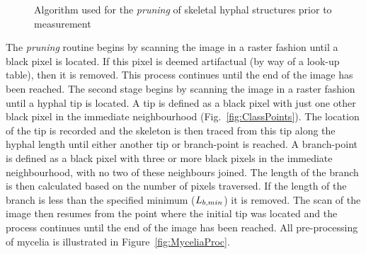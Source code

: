 \begin{figure}[htbp]
	\centering
	\caption{Algorithm used for the \emph{pruning} of skeletal hyphal structures prior to measurement}
	\label{fig:PruneAlg}
\end{figure}

The \emph{pruning} routine begins by scanning the image in a raster fashion until a black pixel is located. If this pixel is deemed artifactual (by way of a look-up table), then it is removed. This process continues until the end of the image has been reached. The second stage begins by scanning the image in a raster fashion until a hyphal tip is located. A tip is defined as a black pixel with just one other black pixel in the immediate neighbourhood (Fig.~\ref{fig:ClassPoints}). The location of the tip is recorded and the skeleton is then traced from this tip along the hyphal length until either another tip or branch-point is reached. A branch-point is defined as a black pixel with three or more black pixels in the immediate neighbourhood, with no two of these neighbours joined. The length of the branch is then calculated based on the number of pixels traversed. If the length of the branch is less than the specified minimum ($L_{b,min}$) it is removed. The scan of the image then resumes from the point where the initial tip was located and the process continues until the end of the image has been reached. All pre-processing of mycelia is illustrated in Figure~\ref{fig:MyceliaProc}.

